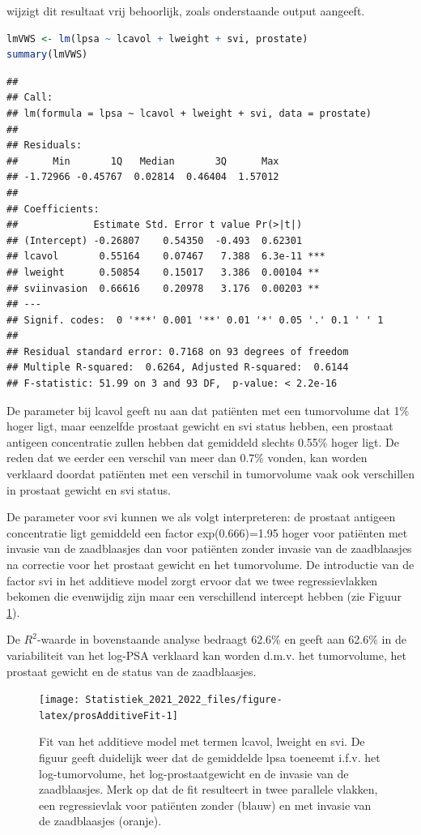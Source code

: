 \documentclass[
  12pt,dutch,coursenotes]{book}
\theoremstyle{definition}
\theoremstyle{definition}
\theoremstyle{definition}
\theoremstyle{definition}
\theoremstyle{remark}
\begin{document}
wijzigt dit resultaat vrij behoorlijk, zoals onderstaande output aangeeft.

\begin{lstlisting}[language=R]
lmVWS <- lm(lpsa ~ lcavol + lweight + svi, prostate)
summary(lmVWS)
\end{lstlisting}

\begin{lstlisting}
## 
## Call:
## lm(formula = lpsa ~ lcavol + lweight + svi, data = prostate)
## 
## Residuals:
##      Min       1Q   Median       3Q      Max 
## -1.72966 -0.45767  0.02814  0.46404  1.57012 
## 
## Coefficients:
##             Estimate Std. Error t value Pr(>|t|)    
## (Intercept) -0.26807    0.54350  -0.493  0.62301    
## lcavol       0.55164    0.07467   7.388  6.3e-11 ***
## lweight      0.50854    0.15017   3.386  0.00104 ** 
## sviinvasion  0.66616    0.20978   3.176  0.00203 ** 
## ---
## Signif. codes:  0 '***' 0.001 '**' 0.01 '*' 0.05 '.' 0.1 ' ' 1
## 
## Residual standard error: 0.7168 on 93 degrees of freedom
## Multiple R-squared:  0.6264, Adjusted R-squared:  0.6144 
## F-statistic: 51.99 on 3 and 93 DF,  p-value: < 2.2e-16
\end{lstlisting}

De parameter bij lcavol geeft nu aan dat patiënten met een tumorvolume dat 1\% hoger ligt, maar eenzelfde prostaat gewicht en svi status hebben, een prostaat antigeen concentratie zullen hebben dat gemiddeld slechts 0.55\% hoger ligt.
De reden dat we eerder een verschil van meer dan 0.7\% vonden, kan worden verklaard doordat patiënten met een verschil in tumorvolume vaak ook verschillen in prostaat gewicht en svi status.

De parameter voor svi kunnen we als volgt interpreteren: de prostaat antigeen concentratie ligt gemiddeld een factor exp(0.666)=1.95 hoger voor patiënten met invasie van de zaadblaasjes dan voor patiënten zonder invasie van de zaadblaasjes na correctie voor het prostaat gewicht en het tumorvolume. De introductie van de factor svi in het additieve model zorgt ervoor dat we twee regressievlakken bekomen die evenwijdig zijn maar een verschillend intercept hebben (zie Figuur \ref{fig:prosAdditiveFit}).

De \(R^2\)-waarde in bovenstaande analyse bedraagt 62.6\% en geeft aan 62.6\% in de variabiliteit van het log-PSA verklaard kan worden d.m.v. het tumorvolume, het prostaat gewicht en de status van de zaadblaasjes.

\begin{figure}

{\centering \texttt{[image: Statistiek\_2021\_2022\_files/figure-latex/prosAdditiveFit-1]} 

}

\caption{Fit van het additieve model met termen lcavol, lweight en svi. De figuur geeft duidelijk weer dat de gemiddelde lpsa toeneemt i.f.v. het log-tumorvolume, het log-prostaatgewicht en de invasie van de zaadblaasjes. Merk op dat de fit resulteert in twee parallele vlakken, een regressievlak voor patiënten zonder (blauw) en met invasie van de zaadblaasjes (oranje).}\label{fig:prosAdditiveFit}
\end{figure}
\end{document}
